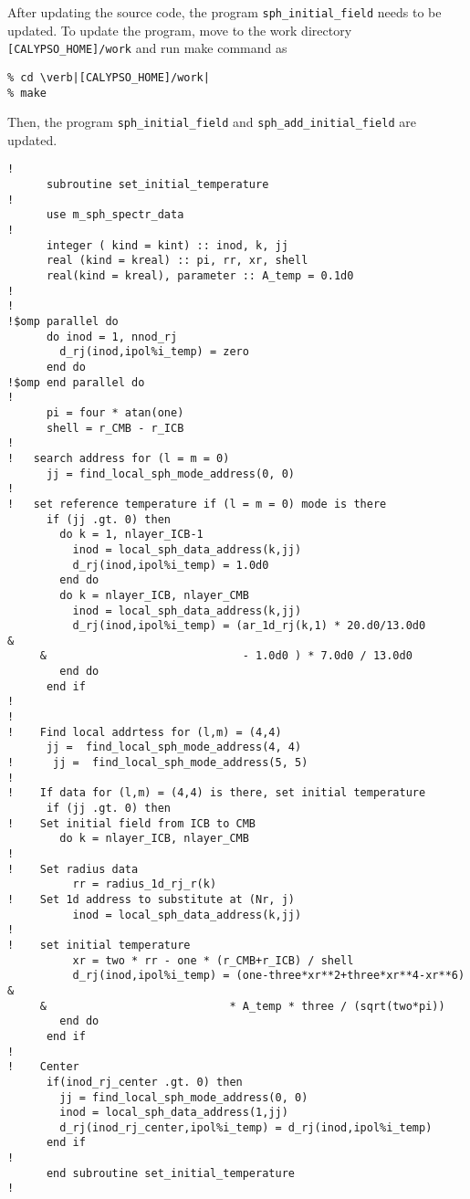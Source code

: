 After updating the source code, the program \verb|sph_initial_field| needs to be updated. To update the program, move to the work directory \verb|[CALYPSO_HOME]/work| and run make command as
% 
\begin{verbatim}
% cd \verb|[CALYPSO_HOME]/work|
% make
\end{verbatim}
%
Then, the program  \verb|sph_initial_field| and  \verb|sph_add_initial_field| are updated.

%
{\small
\begin{verbatim}
!
      subroutine set_initial_temperature
!
      use m_sph_spectr_data
!
      integer ( kind = kint) :: inod, k, jj
      real (kind = kreal) :: pi, rr, xr, shell
      real(kind = kreal), parameter :: A_temp = 0.1d0
!
!
!$omp parallel do
      do inod = 1, nnod_rj
        d_rj(inod,ipol%i_temp) = zero
      end do
!$omp end parallel do
!
      pi = four * atan(one)
      shell = r_CMB - r_ICB
!
!   search address for (l = m = 0)
      jj = find_local_sph_mode_address(0, 0)
!
!   set reference temperature if (l = m = 0) mode is there
      if (jj .gt. 0) then
        do k = 1, nlayer_ICB-1
          inod = local_sph_data_address(k,jj)
          d_rj(inod,ipol%i_temp) = 1.0d0
        end do
        do k = nlayer_ICB, nlayer_CMB
          inod = local_sph_data_address(k,jj)
          d_rj(inod,ipol%i_temp) = (ar_1d_rj(k,1) * 20.d0/13.0d0        &
     &                              - 1.0d0 ) * 7.0d0 / 13.0d0
        end do
      end if
!
!
!    Find local addrtess for (l,m) = (4,4)
      jj =  find_local_sph_mode_address(4, 4)
!      jj =  find_local_sph_mode_address(5, 5)
!
!    If data for (l,m) = (4,4) is there, set initial temperature
      if (jj .gt. 0) then
!    Set initial field from ICB to CMB
        do k = nlayer_ICB, nlayer_CMB
!
!    Set radius data
          rr = radius_1d_rj_r(k)
!    Set 1d address to substitute at (Nr, j)
          inod = local_sph_data_address(k,jj)
!
!    set initial temperature
          xr = two * rr - one * (r_CMB+r_ICB) / shell
          d_rj(inod,ipol%i_temp) = (one-three*xr**2+three*xr**4-xr**6)  &
     &                            * A_temp * three / (sqrt(two*pi))
        end do
      end if
!
!    Center
      if(inod_rj_center .gt. 0) then
        jj = find_local_sph_mode_address(0, 0)
        inod = local_sph_data_address(1,jj)
        d_rj(inod_rj_center,ipol%i_temp) = d_rj(inod,ipol%i_temp)
      end if
!
      end subroutine set_initial_temperature
!
\end{verbatim}
}
%

